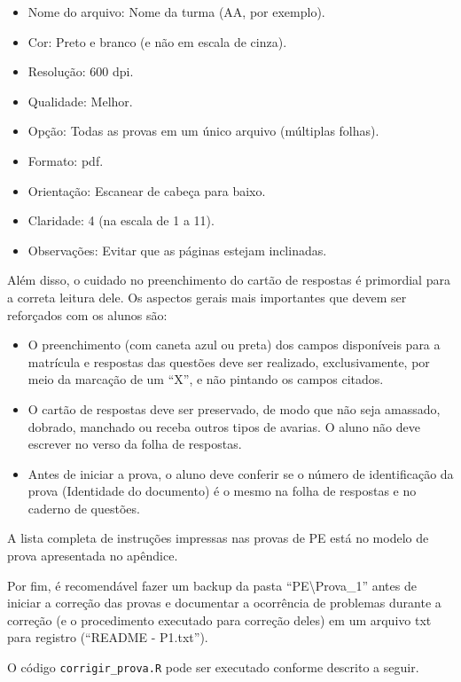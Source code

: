 \documentclass[a4paper]{report}
\providecommand{\tightlist}{%
  \setlength{\itemsep}{0pt}\setlength{\parskip}{0pt}}
\begin{document}
\begin{itemize}
\tightlist
\item
  Nome do arquivo: Nome da turma (AA, por exemplo).
\item
  Cor: Preto e branco (e não em escala de cinza).
\item
  Resolução: 600 dpi.
\item
  Qualidade: Melhor.
\item
  Opção: Todas as provas em um único arquivo (múltiplas folhas).
\item
  Formato: pdf.
\item
  Orientação: Escanear de cabeça para baixo.
\item
  Claridade: 4 (na escala de 1 a 11).
\item
  Observações: Evitar que as páginas estejam inclinadas.
\end{itemize}

Além disso, o cuidado no preenchimento do cartão de respostas é
primordial para a correta leitura dele. Os aspectos gerais mais
importantes que devem ser reforçados com os alunos são:

\begin{itemize}
\tightlist
\item
  O preenchimento (com caneta azul ou preta) dos campos disponíveis para
  a matrícula e respostas das questões deve ser realizado,
  exclusivamente, por meio da marcação de um ``X'', e não pintando os
  campos citados.
\item
  O cartão de respostas deve ser preservado, de modo que não seja
  amassado, dobrado, manchado ou receba outros tipos de avarias. O aluno
  não deve escrever no verso da folha de respostas.
\item
  Antes de iniciar a prova, o aluno deve conferir se o número de
  identificação da prova (Identidade do documento) é o mesmo na folha de
  respostas e no caderno de questões.
\end{itemize}

A lista completa de instruções impressas nas provas de PE está no modelo
de prova apresentada no apêndice.

Por fim, é recomendável fazer um backup da pasta
``PE\textbackslash{}Prova\_1'' antes de iniciar a correção das provas e
documentar a ocorrência de problemas durante a correção (e o
procedimento executado para correção deles) em um arquivo txt para
registro (``README - P1.txt'').

O código \texttt{corrigir\_prova.R} pode ser executado conforme descrito
a seguir.
\end{document}
